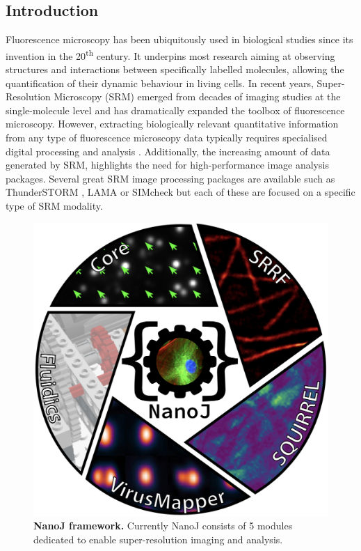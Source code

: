 \subsection*{Introduction}
 Fluorescence microscopy has been ubiquitously used in biological studies since its invention in the 20\textsuperscript{th} century. It underpins most research aiming at observing structures and interactions between specifically labelled molecules, allowing the quantification of their dynamic behaviour in living cells. In recent years, Super-Resolution Microscopy (SRM) \cite{betzig2006imaging,rust2006sub,hell1994breaking} emerged from decades of imaging studies at the single-molecule level and has dramatically expanded the toolbox of fluorescence microscopy. However, extracting biologically relevant quantitative information from any type of fluorescence microscopy data typically requires specialised digital processing and analysis \cite{wheeler2017standard}. Additionally, the increasing amount of data generated by SRM, highlights the need for high-performance image analysis packages.  Several great SRM image processing packages are available such as ThunderSTORM \cite{ovesny2014thunderstorm}, LAMA \cite{Malkusch2016LAMA} or SIMcheck \cite{schermelleh2015simcheck} but each of these are focused on a specific type of SRM modality.
  
 \begin{figure}[!t]
    \centering
    \includegraphics[width=\linewidth]{Figures/Figure1_v3.png}
    \caption{\textbf{NanoJ framework.} Currently NanoJ consists of 5 modules dedicated to enable super-resolution imaging and analysis.}
    \label{fig:GeneralDiagram}
 \end{figure}
  
